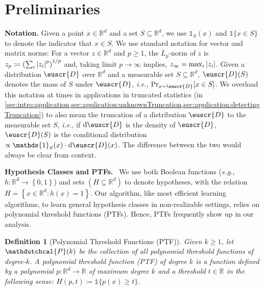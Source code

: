 \documentclass[11pt]{article}
\theoremstyle{plain}
\newtheorem{definition}{Definition}
\theoremstyle{definition}
\theoremstyle{remark}
\def\abs#1{\left| #1 \right|}
\newcommand{\sinbrace}[1]{\{#1\}}
\newcommand{\inbrace}[1]{\left\{#1\right\}}
\newcommand{\inparen}[1]{\left(#1\right)}
\let\norm\relax
\newcommand{\norm}[1]{\ensuremath{\left\lVert #1 \right\rVert}}
\newcommand{\R}{\mathbb{R}}
\newcommand\ind{\mathds{1}}
\newcommand{\sfrac}[2]{{#1/#2}}
\newcommand{\customcal}[1]{\euscr{#1}}
\newcommand{\cD}{\customcal{D}}
\renewcommand{\paragraph}[1]{\medskip \noindent\textbf{#1}~}
\newcommand{\ie}{\textit{i.e.}}
\newcommand{\eg}{\textit{e.g.}}
\newcommand{\hypo}[1]{\mathdutchcal{#1}}
\newcommand{\hyP}{\hypo{P}}
\renewcommand{\d}{{\rm d}}
\newcommand{\nL}{L}
\begin{document}
            
       
    \section{Preliminaries}\label{sec:preliminaries}
    
    \textbf{Notation.}\quad 
    Given a point $x\in \R^d$ and a set $S\subseteq\R^d$, we use $\mathds{1}_S(x)$ and $\ind\{x \in S\}$ to denote the indicator that $x\in S$.
    We use standard notation for vector and matrix norms:
    For a vector $z\in \R^d$ and $p\geq 1$, the $\nL_p$-norm of $z$ is $\norm{z}_p\coloneqq \inparen{\sum_i \abs{z_i}^p}^{\sfrac{1}{p}}$ and, taking limit $p\to\infty$ implies, $\norm{z}_\infty=\max_i \abs{z_i}$.
    Given a distribution $\cD$ over $\R^d$ and a measurable set $S\subseteq\R^d$, $\cD(S)$ denotes the mass of $S$ under $\cD$, \ie{}, $\Pr_{x\sim \cD}[x\in S]$.
    We overload this notation at times in applications in truncated statistics (in \cref{sec:intro:application,sec:application:unknownTruncation,sec:application:detectingTruncation}) to also mean the truncation of a distribution $\cD$ to the measurable set $S$, \ie{}, if $\d\cD$ is the density of $\cD$, $\cD(S)$ is the conditional distribution $\propto \ind_S(x) \cdot \d\cD(x)$. 
    The difference between the two would always be clear from context.

    \paragraph{Hypothesis Classes and PTFs.} 
    We use both Boolean functions (\eg{}, $h\colon \R^d \rightarrow \inbrace{0,1}$) and sets $(H \subseteq \R^d)$ to denote hypotheses, with the relation $H = \inbrace{x \in \R^d \colon h(x) = 1}$. 
    Our algorithm, like most efficient learning algorithms, to learn general hypothesis classes in non-realizable settings, relies on polynomial threshold functions (PTFs).
    Hence, PTFs frequently show up in our analysis.

    \begin{definition}[Polynomial Threshold Functions (PTF)]\label{def:ptfs:polynomials}
        Given $k\geq 1$, let $\hyP(k)$ be the collection of all polynomial threshold functions of degree-$k$.
        A polynomial threshold function (PTF) of degree $k$ is a function defined by a polynomial $p\colon \R^d \rightarrow \R$ of maximum degree $k$ and a threshold $t \in \R$ in the following sense:
        $H({p,t})\coloneqq \mathds{1}\sinbrace{p(x)\geq t}$. 
    \end{definition}
\end{document}
